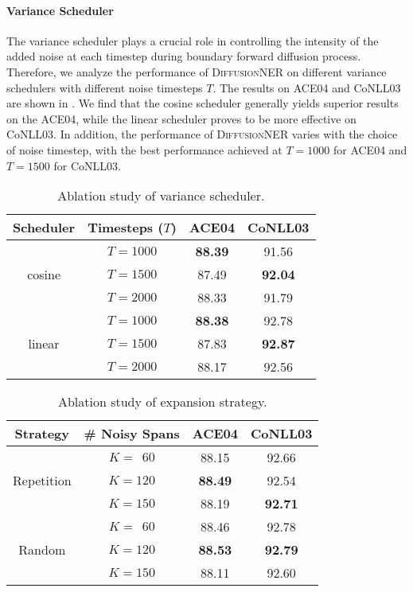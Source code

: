 \documentclass[11pt]{article}
\begin{document}
\paragraph{Variance Scheduler}
The variance scheduler plays a crucial role in controlling the intensity of the added noise at each timestep during boundary forward diffusion process. Therefore, we analyze the performance of \textsc{DiffusionNER} on different variance schedulers with different noise timesteps $T$. The results on ACE04 and CoNLL03 are shown in . We find that the cosine scheduler generally yields superior results on the ACE04, while the linear scheduler proves to be more effective on CoNLL03. In addition, the performance of \textsc{DiffusionNER} varies with the choice of noise timestep, with the best performance achieved at $T = 1000$ for ACE04 and $T = 1500$ for CoNLL03.


\begin{table}[]
    \centering
    \small
    \begin{tabular}{cccc}
    \toprule
    Scheduler & Timesteps ($T$) & ACE04 & CoNLL03\\
    \midrule
     \multirow{3}{*}{cosine} 
     &${T=1000}$ & \textbf{88.39}  & 91.56  \\
     &${T=1500}$ & 87.49 & \textbf{92.04}\\
     &${T=2000}$ & 88.33 & 91.79\\
    \midrule
    \multirow{3}{*}{linear} 
     &${T=1000}$ & \textbf{88.38}  & 92.78 \\
     &${T=1500}$ & 87.83 & \textbf{92.87} \\
     &${T=2000}$ & 88.17 & 92.56\\
    \bottomrule
    \end{tabular}
    \caption{Ablation study of variance scheduler. }
    \label{tab:variancescheduler}
\end{table}


\begin{table}[]
    \centering
    \small
    \begin{tabular}{cccc}
    \toprule
    Strategy & \# Noisy Spans& ACE04 & CoNLL03\\
    \midrule
     \multirow{3}{*}{Repetition} 
     &${K=\ \ 60}$ & 88.15  & 92.66 \\
     &${K=120}$ & \textbf{88.49} & 92.54 \\
     &${K=150}$ & 88.19 & \textbf{92.71} \\
    \midrule
    \multirow{3}{*}{Random} 
    & ${K=\ \ 60}$ & 88.46 & 92.78 \\
    & ${K=120}$ & \textbf{88.53} & \textbf{92.79} \\
    & ${K=150}$ & 88.11 & 92.60 \\
    \bottomrule
    \end{tabular}
    \caption{Ablation study of expansion strategy. }
    \label{tab:expansionstrategy}
\end{table}
\end{document}
